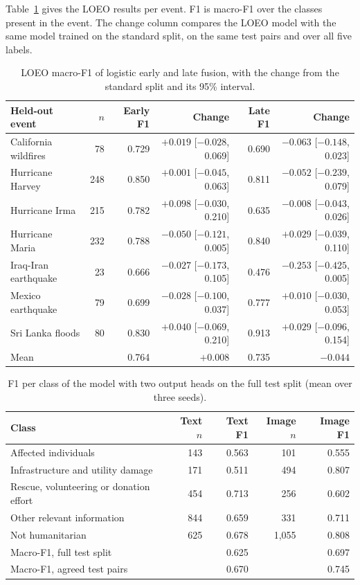 \documentclass[11pt,a4paper]{article}
\begin{document}
Table~\ref{tab:loeo} gives the LOEO results per event. F1 is macro-F1
over the classes present in the event. The change column compares the
LOEO model with the same model trained on the standard split, on the same
test pairs and over all five labels.

\begin{table}[H]
  \centering
  \footnotesize
  \setlength{\tabcolsep}{4pt}
  \caption{LOEO macro-F1 of logistic early and late fusion, with the
  change from the standard split and its 95\% interval.}
  \label{tab:loeo}
  \begin{tabular}{@{}lrrrrr@{}}
    \toprule
    Held-out event & $n$ & Early F1 & Change & Late F1 & Change \\
    \midrule
    California wildfires & 78 & 0.729 & $+0.019$ [$-0.028$, 0.069] & 0.690 & $-0.063$ [$-0.148$, 0.023] \\
    Hurricane Harvey & 248 & 0.850 & $+0.001$ [$-0.045$, 0.063] & 0.811 & $-0.052$ [$-0.239$, 0.079] \\
    Hurricane Irma & 215 & 0.782 & $+0.098$ [$-0.030$, 0.210] & 0.635 & $-0.008$ [$-0.043$, 0.026] \\
    Hurricane Maria & 232 & 0.788 & $-0.050$ [$-0.121$, 0.005] & 0.840 & $+0.029$ [$-0.039$, 0.110] \\
    Iraq-Iran earthquake & 23 & 0.666 & $-0.027$ [$-0.173$, 0.105] & 0.476 & $-0.253$ [$-0.425$, 0.005] \\
    Mexico earthquake & 79 & 0.699 & $-0.028$ [$-0.100$, 0.037] & 0.777 & $+0.010$ [$-0.030$, 0.053] \\
    Sri Lanka floods & 80 & 0.830 & $+0.040$ [$-0.069$, 0.210] & 0.913 & $+0.029$ [$-0.096$, 0.154] \\
    \midrule
    Mean & & 0.764 & $+0.008$ & 0.735 & $-0.044$ \\
    \bottomrule
  \end{tabular}
\end{table}

\begin{table}[H]
  \centering
  \small
  \caption{F1 per class of the model with two output heads on the full
  test split (mean over three seeds).}
  \label{tab:dual}
  \begin{tabular}{lrrrr}
    \toprule
    Class & Text $n$ & Text F1 & Image $n$ & Image F1 \\
    \midrule
    Affected individuals & 143 & 0.563 & 101 & 0.555 \\
    Infrastructure and utility damage & 171 & 0.511 & 494 & 0.807 \\
    Rescue, volunteering or donation effort & 454 & 0.713 & 256 & 0.602 \\
    Other relevant information & 844 & 0.659 & 331 & 0.711 \\
    Not humanitarian & 625 & 0.678 & 1,055 & 0.808 \\
    \midrule
    Macro-F1, full test split & & 0.625 & & 0.697 \\
    Macro-F1, agreed test pairs & & 0.670 & & 0.745 \\
    \bottomrule
  \end{tabular}
\end{table}
\end{document}
